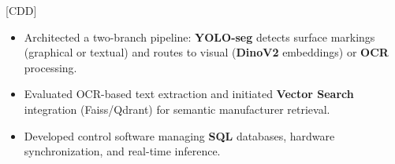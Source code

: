 [CDD]
\begin{itemize}
\item Architected a two-branch pipeline: \textbf{YOLO-seg} detects surface markings (graphical or textual) and routes to visual (\textbf{DinoV2} embeddings) or \textbf{OCR} processing.
\item Evaluated OCR-based text extraction and initiated \textbf{Vector Search} integration (Faiss/Qdrant) for semantic manufacturer retrieval.
\item Developed control software managing \textbf{SQL} databases, hardware synchronization, and real-time inference.
\end{itemize}

{\LaTeXraggedright
{}
\par}
